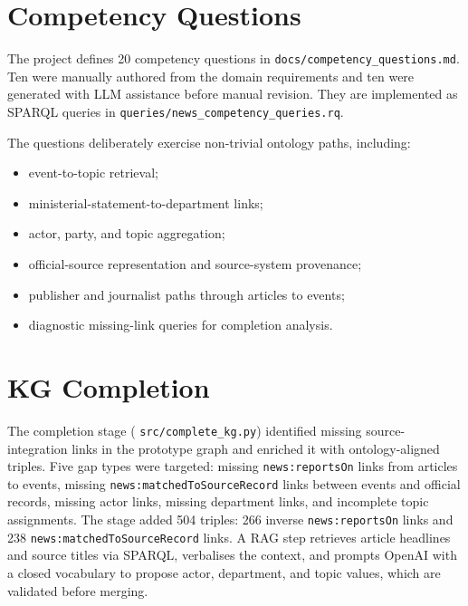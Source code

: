 \documentclass[runningheads]{llncs}
\newcommand{\filepath}[1]{%
  \begingroup\hypersetup{urlcolor=black}\nolinkurl{#1}\endgroup}
\newcommand{\ns}[1]{\texttt{news:#1}}
\begin{document}
\section{Competency Questions}\label{sec:cq}

The project defines 20 competency questions in
\filepath{docs/competency_questions.md}. Ten were manually authored from the
domain requirements and ten were generated with LLM assistance before manual
revision. They are implemented as SPARQL queries in
\filepath{queries/news_competency_queries.rq}.

The questions deliberately exercise non-trivial ontology paths, including:

\begin{itemize}[leftmargin=*,nosep]
    \item event-to-topic retrieval;
    \item ministerial-statement-to-department links;
    \item actor, party, and topic aggregation;
    \item official-source representation and source-system provenance;
    \item publisher and journalist paths through articles to events;
    \item diagnostic missing-link queries for completion analysis.
\end{itemize}

\section{KG Completion}\label{sec:completion}

The completion stage (\filepath{src/complete\_kg.py}) identified missing source-integration
links in the prototype graph and enriched it with ontology-aligned triples. Five gap
types were targeted: missing \ns{reportsOn} links from articles to events, missing
\ns{matchedToSourceRecord} links between events and official records, missing actor
links, missing department links, and incomplete topic assignments. The stage added 504
triples: 266 inverse \ns{reportsOn} links and 238 \ns{matchedToSourceRecord} links.
A RAG step retrieves article headlines and source titles via SPARQL, verbalises the
context, and prompts OpenAI with a closed vocabulary to propose actor, department, and
topic values, which are validated before merging.
\end{document}
